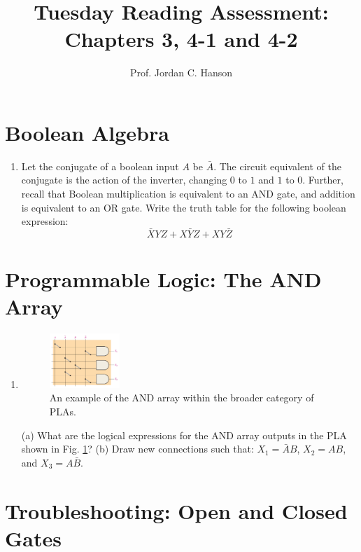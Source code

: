 \documentclass{article}
\begin{document}
\title{Tuesday Reading Assessment: Chapters 3, 4-1 and 4-2}
\author{Prof. Jordan C. Hanson}

\maketitle

\section{Boolean Algebra}

\begin{enumerate}
\item Let the conjugate of a boolean input $A$ be $\bar{A}$.  The circuit equivalent of the conjugate is the action of the inverter, changing $0$ to $1$ and $1$ to $0$.  Further, recall that Boolean multiplication is equivalent to an AND gate, and addition is equivalent to an OR gate.  Write the truth table for the following boolean expression:
\begin{equation}
\bar{X} Y Z + X\bar{Y}Z + XY\bar{Z}
\end{equation}
\vspace{1cm}
\end{enumerate}

\section{Programmable Logic: The AND Array}

\begin{enumerate}
\item
\begin{figure}[ht]
\centering
\includegraphics[width=0.25\textwidth]{figures/ANDArray.pdf}
\caption{\label{fig:array} An example of the AND array within the broader category of PLAs.}
\end{figure}
(a) What are the logical expressions for the AND array outputs in the PLA shown in Fig. \ref{fig:array}? (b) Draw new connections such that: $X_1 = \bar{A}B$, $X_2 = AB$, and $X_3 = A\bar{B}$.
\end{enumerate}

\section{Troubleshooting: Open and Closed Gates}
\end{document}
